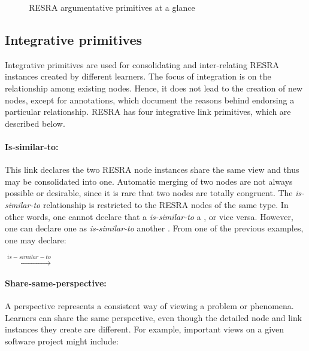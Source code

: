 \begin{itemize}
{\begin{figure}[htb]
  \caption{RESRA argumentative primitives at a glance}
  \label{fig:arg-resra}
\end{figure}


\subsection{Integrative primitives}
\label{sec:integrative primitives}

Integrative primitives are used for consolidating and inter-relating RESRA
instances created by different learners. The focus of integration is on the
relationship among existing nodes. Hence, it does not lead to the creation
of new nodes, except for annotations, which document the reasons behind
endorsing a particular relationship. RESRA has four integrative link
primitives, which are described below.

\paragraph{Is-similar-to:}

This link declares the two RESRA node instances share the same view and
thus may be consolidated into one. Automatic merging of two nodes are not
always possible or desirable, since it is rare that two nodes are totally
congruent. The {\it is-similar-to\/} relationship is restricted to the
RESRA nodes of the same type. In other words, one cannot declare that a
 {\it is-similar-to\/} a , or vice
versa.  However, one can declare one  as {\it
is-similar-to\/} another . From one of the
previous examples, one may declare:

\indent {} \(
  \stackrel{is-similar-to}{\longrightarrow} \) 

\paragraph{Share-same-perspective:}
  
A perspective represents a consistent way of viewing a problem or
phenomena. Learners can share the same perspective, even though the
detailed node and link instances they create are different. For example,
important views on a given software project might include:

}
\end{itemize}
